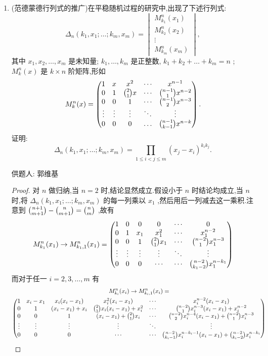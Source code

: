 \documentclass[lang=cn,12pt,a4paper]{elegantpaper.cls}
\begin{document}
\begin{enumerate}
	
	\item
(范德蒙德行列式的推广)在平稳随机过程的研究中,出现了下述行列式:
\[
\Delta_n(k_1,x_1;\dots;k_m,x_m)=\begin{vmatrix}
	M_{k_1}^n(x_1)\\
	M_{k_2}^n(x_2)\\
	\vdots\\
	M_{k_m}^n(x_m)
\end{vmatrix},
\]
其中 $x_1,x_2,\dots,x_m$ 是未知量; $k_1,\dots,k_m$ 是正整数, $k_1+k_2+\dots+k_m=n$ ; $M_k^n(x)$ 是 $k\times n$ 阶矩阵,形如
\[
M_k^n(x)=\begin{pmatrix}
	1 & x & x^2 & \cdots & x^{n-1} \\
	0 & 1 & \tbinom{2}{1}x & \cdots & \tbinom{n-1}{1}x^{n-2} \\
	0 & 0 & 1 & \cdots & \tbinom{n-1}{2}x^{n-3} \\
	\vdots & \vdots & \vdots & \ddots & \vdots \\
	0 & 0 & 0 & \dots &\tbinom{n-1}{k-1}x^{n-k}
\end{pmatrix}.
\]
证明:
\[
\Delta_n(k_1,x_1;\dots;k_m,x_m)=\prod\limits_{1\leqslant i<j\leqslant m}(x_j-x_i)^{k_ik_j}.
\]
\begin{flushright}
	\kaishu
	供题人: 郭维基
\end{flushright}
	\begin{proof}
		对 $n$ 做归纳,当 $n=2$ 时,结论显然成立.假设小于 $n$ 时结论均成立,当 $n$ 时,将 $\Delta_n(k_1,x_1;\dots;k_m,x_m)$ 的每一列乘以 $x_1$ ,然后用后一列减去这一乘积.注意到 $\tbinom{n+1}{m+1}-\tbinom{n}{m+1}=\tbinom{n}{m}$ ,故有
		\[
		M_{k_1}^n(x_1)\rightarrow M_{k_1,1}^{n}(x_1)=\begin{pmatrix}
			1 & 0 & 0 & 0 & \cdots & 0 \\
			0 & 1 & x_1 & x_1^2 & \cdots & x_1^{n-2} \\
			0 & 0 & 1 & \tbinom{2}{1}x_1 & \cdots & \tbinom{n-2}{1}x_1^{n-3} \\
			\vdots & \vdots & \vdots & \vdots & \ddots & \vdots \\
			0 & 0 & 0 & \cdots & \cdots & \tbinom{n-2}{k_1-2}x_1^{n-k_1}
		\end{pmatrix}
		\]
		而对于任一 $i=2,3,\dots,m$ 有
		\begin{gather*}
			M_{k_i}^n(x_i)\rightarrow M_{k_i,1}^n(x_i)= \\
			\begin{pmatrix}
				1 & x_i-x_1 & x_i(x_i-x_1) & x_i^2(x_i-x_1) & \cdots & x_i^{n-2}(x_i-x_1) \\
				0 & 1 & (x_i-x_1)+x_i & \tbinom{2}{1}x_i(x_i-x_1)+x_i^2 & \cdots & \tbinom{n-2}{1}x_i^{n-3}(x_i-x_1)+x_i^{n-2} \\
				0 & 0 & 1 & (x_i-x_1)+\tbinom{2}{1}x_i & \cdots & \tbinom{n-2}{2}x_i^{n-4}(x_i-x_1)+\tbinom{n-2}{1}x_i^{n-3} \\
				\vdots & \vdots & \vdots & \vdots & \ddots & \vdots \\
				0 & 0 & 0 & \cdots & \cdots & \tbinom{n-2}{k_i-1}x_i^{n-k_i-1}(x_i-x_1)+\tbinom{n-2}{k_i-2}x_i^{n-k_i}
			\end{pmatrix}
		\end{gather*}
		

\end{proof}
\end{enumerate}
\end{document}
